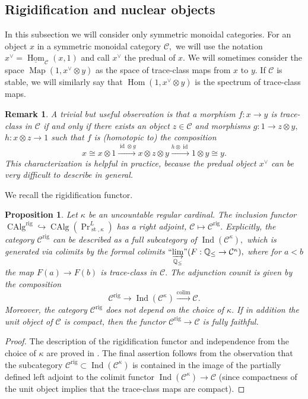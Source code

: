 \documentclass[11pt,leqno]{amsart}
\newtheorem{prop}[theo]{Proposition}
\newtheorem{remark}[theo]{Remark}
\numberwithin{equation}{section}
\def\Q{\mathbb{Q}}
\def\Hom{\operatorname{Hom}}
\def\Map{\operatorname{Map}}
\DeclareMathOperator*{\colim}{colim}
\newcommand{\indlim}[1][]{\mathop{\varinjlim}\limits_{#1}}
\newcommand{\inddlim}[1][]{{``{\indlim[#1]}"}}
\newcommand{\xto}{\xrightarrow}
\newcommand{\hto}{\hookrightarrow}
\newcommand{\rig}{\operatorname{rig}}
\newcommand{\st}{\operatorname{st}}
\newcommand{\cC}{{\mathcal C}}
\newcommand{\un}{\underline}
\newcommand{\CAlg}{\operatorname{CAlg}}
\newcommand{\Ind}{\operatorname{Ind}}
\newcommand{\id}{\operatorname{id}}
\begin{document}
\subsection{Rigidification and nuclear objects}

In this subsection we will consider only symmetric monoidal categories. For an object $x$ in a symmetric monoidal category $\cC,$ we will use the notation $x^{\vee}=\un{\Hom}_{\cC}(x,1)$ and call $x^{\vee}$ the predual of $x.$ We will sometimes consider the space $\Map(1,x^{\vee}\otimes y)$ as the space of trace-class maps from $x$ to $y.$ If $\cC$ is stable, we will similarly say that $\Hom(1,x^{\vee}\otimes y)$ is the spectrum of trace-class maps.

\begin{remark} A trivial but useful observation is that a morphism $f:x\to y$ is trace-class in $\cC$ if and only if there exists an object $z\in\cC$ and morphisms $g:1\to z\otimes y,$ $h:x\otimes z\to 1$ such that $f$ is (homotopic to) the composition
\begin{equation*}
x\cong x\otimes 1\xto{\id\otimes g} x\otimes z\otimes y\xto{h\otimes\id} 1\otimes y\cong y.	
\end{equation*}	This characterization is helpful in practice, because the predual object $x^{\vee}$ can be very difficult to describe in general.\end{remark}

We recall the rigidification functor.

\begin{prop}\cite{Ram24b}\label{prop:rigidification}
Let $\kappa$ be an uncountable regular cardinal. The inclusion functor $\CAlg^{\rig}\hto \CAlg(\Pr^L_{\st,\kappa})$ has a right adjoint, $\cC\mapsto\cC^{\rig}.$ Explicitly, the category $\cC^{\rig}$ can be described as a full subcategory of $\Ind(\cC^{\kappa}),$ which is generated via colimits by the formal colimits $\inddlim[\Q_{\leq}](F:\Q_{\leq}\to\cC^{\kappa}),$ where for $a<b$ the map $F(a)\to F(b)$ is trace-class in $\cC.$ The adjunction counit is given by the composition
\begin{equation*}
\cC^{\rig}\to\Ind(\cC^{\kappa})\xto{\colim}\cC.
\end{equation*}
Moreover, the category $\cC^{\rig}$ does not depend on the choice of $\kappa.$ If in addition the unit object of $\cC$ is compact, then the functor $\cC^{\rig}\to\cC$ is fully faithful.
\end{prop}

\begin{proof}
The description of the rigidification functor and independence from the choice of $\kappa$ are proved in \cite[Construction 4.75, Theorem 4.77]{Ram24b}. The final assertion follows from the observation that the subcategory $\cC^{\rig}\subset\Ind(\cC^{\kappa})$ is contained in the image of the partially defined left adjoint to the colimit functor $\Ind(\cC^{\kappa})\to\cC$ (since compactness of the unit object implies that the trace-class maps are compact). 
\end{proof}
\end{document}
